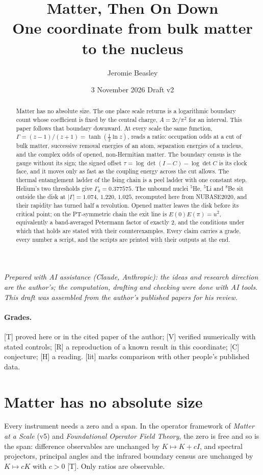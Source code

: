 \documentclass[11pt]{article}
\title{Matter, Then On Down\\[4pt]\large One coordinate from bulk matter to the nucleus}
\author{Jeromie Beasley}
\date{3 November 2026 \quad Draft v2}
\theoremstyle{definition}
\newcommand{\grade}[1]{\textsf{\small[#1]}}
\begin{document}
\maketitle

\noindent\emph{Prepared with AI assistance (Claude, Anthropic): the ideas and research direction are the author's; the computation, drafting and checking were done with AI tools. This draft was assembled from the author's published papers for his review.}

\begin{abstract}
Matter has no absolute size. The one place scale returns is a logarithmic boundary count whose coefficient is fixed by the central charge, $A=2c/\pi^2$ for an interval. This paper follows that boundary downward. At every scale the same function, $\Gamma=(z-1)/(z+1)=\tanh(\tfrac12\ln z)$, reads a ratio: occupation odds at a cut of bulk matter, successive removal energies of an atom, separation energies of a nucleus, and the complex odds of opened, non-Hermitian matter. The boundary census is the gauge without its sign; the signed offset $\tau=\log\det(I-C)-\log\det C$ is its clock face, and it moves only as fast as the coupling energy across the cut allows. The thermal entanglement ladder of the Ising chain is a peel ladder with one constant step. Helium's two thresholds give $\Gamma_0=0.377575$. The unbound nuclei ${}^5$He, ${}^5$Li and ${}^8$Be sit outside the disk at $|\Gamma|=1.074$, $1.220$, $1.025$, recomputed here from NUBASE2020, and their rapidity has turned half a revolution. Opened matter leaves the disk before its critical point; on the PT-symmetric chain the exit line is $E(0)E(\pi)=u^2$, equivalently a band-averaged Petermann factor of exactly 2, and the conditions under which that holds are stated with their counterexamples. Every claim carries a grade, every number a script, and the scripts are printed with their outputs at the end.
\end{abstract}

\paragraph{Grades.} \grade{T} proved here or in the cited paper of the author; \grade{V} verified numerically with stated controls; \grade{R} a reproduction of a known result in this coordinate; \grade{C} conjecture; \grade{H} a reading. \grade{lit} marks comparison with other people's published data.

\section{Matter has no absolute size}
Every instrument needs a zero and a span. In the operator framework of \emph{Matter at a Scale} (v5) and \emph{Foundational Operator Field Theory}, the zero is free and so is the span: difference observables are unchanged by $K\mapsto K+cI$, and spectral projectors, principal angles and the infrared boundary census are unchanged by $K\mapsto cK$ with $c>0$ \grade{T}. Only ratios are observable.
\end{document}
